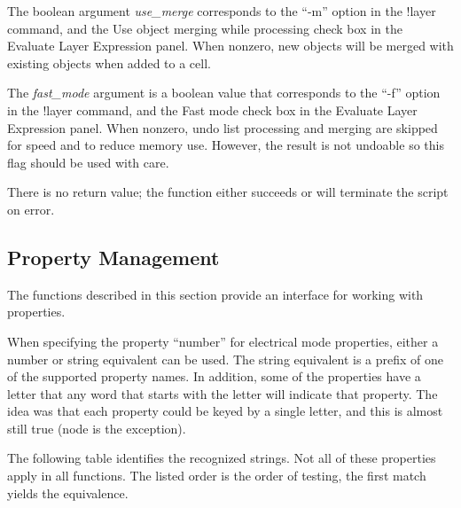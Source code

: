 \begin{description}
The boolean argument {\it use\_merge} corresponds to the ``{\vt -m}''
option in the {\cb !layer} command, and the {\cb Use object merging
while processing} check box in the {\cb Evaluate Layer Expression}
panel.  When nonzero, new objects will be merged with existing objects
when added to a cell.

The {\it fast\_mode} argument is a boolean value that corresponds to
the ``{\vt -f}'' option in the {\cb !layer} command, and the {\cb Fast
mode} check box in the {\cb Evaluate Layer Expression} panel.  When
nonzero, undo list processing and merging are skipped for speed and to
reduce memory use.  However, the result is not undoable so this flag
should be used with care.

There is no return value; the function either succeeds or will
terminate the script on error.
\end{description}


\subsection{Property Management}

The functions described in this section provide an interface for
working with properties.

When specifying the property ``number'' for electrical mode
properties, either a number or string equivalent can be used.  The
string equivalent is a prefix of one of the supported property names. 
In addition, some of the properties have a letter that any word that
starts with the letter will indicate that property.  The idea was that
each property could be keyed by a single letter, and this is almost
still true ({\et node} is the exception).

The following table identifies the recognized strings.  Not all of
these properties apply in all functions.  The listed order is the
order of testing, the first match yields the equivalence.


